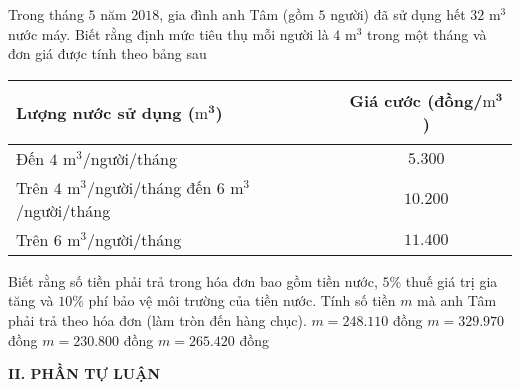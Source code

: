 \begin{ex}%
Trong tháng $5$ năm $2018$, gia đình anh Tâm (gồm $5$ người) đã sử dụng hết $32$ $\mathrm{m}^3$ nước máy. Biết rằng định mức tiêu thụ mỗi người là $4$ $\mathrm{m}^3$ trong một tháng và đơn giá được tính theo bảng sau
\begin{center}
\begin{tabular}{|l|c|}
\hline
\begin{minipage}{8.5cm}
\begin{center}
\textbf{Lượng nước sử dụng ($\mathbf{\mathrm{m}^3}$)} 
\end{center}
\end{minipage}
& \textbf{Giá cước (đồng/$\mathbf{\mathrm{m}^3}$)}\\
\hline
Đến $4$ $\mathrm{m}^3$/người/tháng& $5.300$\\
\hline
Trên $4$ $\mathrm{m}^3$/người/tháng đến $6$ $\mathrm{m}^3$/người/tháng& $10.200$\\
\hline
Trên $6$ $\mathrm{m}^3$/người/tháng& $11.400$\\
\hline
\end{tabular}
\end{center}
Biết rằng số tiền phải trả trong hóa đơn bao gồm tiền nước, $5\%$ thuế giá trị gia tăng và $10\%$ phí bảo vệ môi trường của tiền nước. Tính số tiền $m$ mà anh Tâm phải trả theo hóa đơn (làm tròn đến hàng chục).
\choice
{$m=248.110$ đồng}
{$m=329.970$ đồng}
{$m=230.800$ đồng}
{\True $m=265.420$ đồng}
\end{ex}
\noindent\textbf{II. PHẦN TỰ LUẬN}
\setcounter{ex}{0}

